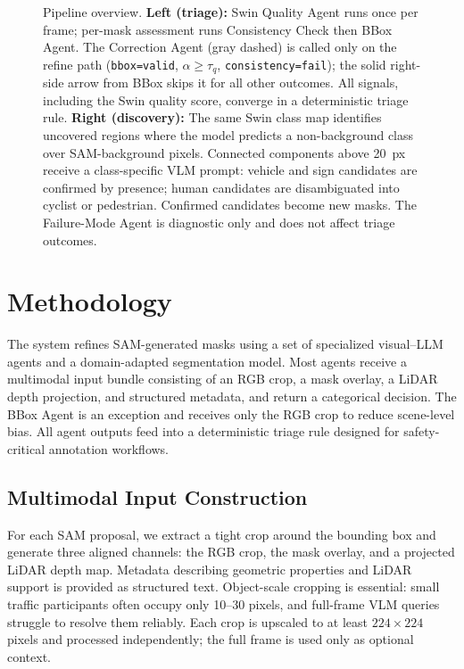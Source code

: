 \documentclass[conference]{IEEEtran}
\begin{document}
\begin{figure}[t]
    \centering
    
    \caption{Pipeline overview. \textbf{Left (triage):} Swin Quality Agent runs once per frame; per-mask assessment runs Consistency Check then BBox Agent. The Correction Agent (gray dashed) is called only on the refine path (\texttt{bbox=valid}, $\alpha{\geq}\tau_q$, \texttt{consistency=fail}); the solid right-side arrow from BBox skips it for all other outcomes. All signals, including the Swin quality score, converge in a deterministic triage rule. \textbf{Right (discovery):} The same Swin class map identifies uncovered regions where the model predicts a non-background class over SAM-background pixels. Connected components above 20~px receive a class-specific VLM prompt: vehicle and sign candidates are confirmed by presence; human candidates are disambiguated into cyclist or pedestrian. Confirmed candidates become new masks. The Failure-Mode Agent is diagnostic only and does not affect triage outcomes.}
    \label{fig:pipeline_end_to_end}
\end{figure}
\section{Methodology}
\label{sec:methodology}

The system refines SAM-generated masks using a set of specialized visual--LLM agents and a domain-adapted segmentation model. 
Most agents receive a multimodal input bundle consisting of an RGB crop, a mask overlay, a LiDAR depth projection, and structured metadata, and return a categorical decision. 
The BBox Agent is an exception and receives only the RGB crop to reduce scene-level bias. 
All agent outputs feed into a deterministic triage rule designed for safety-critical annotation workflows.

\subsection{Multimodal Input Construction}

For each SAM proposal, we extract a tight crop around the bounding box and generate three aligned channels: the RGB crop, the mask overlay, and a projected LiDAR depth map. 
Metadata describing geometric properties and LiDAR support is provided as structured text. 
Object-scale cropping is essential: small traffic participants often occupy only 10--30 pixels, and full-frame VLM queries struggle to resolve them reliably. 
Each crop is upscaled to at least $224{\times}224$ pixels and processed independently; the full frame is used only as optional context.
\end{document}
